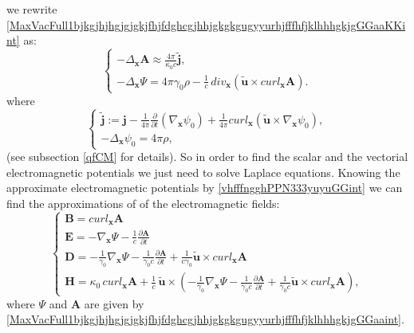 \documentclass{article}
\theoremstyle{definition}
\theoremstyle{remark}
\renewcommand{\vec}[1]{\mathbf{#1}}
\newcommand{\R}{\mathbb{R}}
\newcommand{\er}{\eqref}
\newcommand{\R}{{\mathbb{R}}}
\newcommand{\er}{\eqref}
\begin{document}
%
%
%
we rewrite
\er{MaxVacFull1bjkgjhjhgjgjgkjfhjfdghcgjhhjgkgkgugyyurhjfffhfjklhhhgkjgGGaaKKint}
as:
\begin{equation}\label{MaxVacFull1bjkgjhjhgjgjgkjfhjfdghcgjhhjgkgkgugyyurhjfffhfjklhhhgkjgGGaaint}
\begin{cases}
-\Delta_{\vec x}\vec A \approx\frac{4\pi}{\kappa_0 c}\vec {\widetilde j},\\
-\Delta_{\vec x}\Psi= 4\pi\gamma_0\rho-\frac{1}{c}\,div_{\vec
x}\left(\vec {\tilde u}\times curl_{\vec x} \vec A\right).
\end{cases}
\end{equation}
where
\begin{equation}\label{reducedcurrentfhfhjfhjGGaakklklint}
\begin{cases}
\vec {\widetilde j}:=\vec j-\frac{1}{4\pi}\frac{\partial}{\partial
t} \left(\nabla_{\vec x}\psi_0\right)+\frac{1}{4\pi}curl_{\vec
x}\left(\vec {\tilde u}\times \nabla_{\vec x}\psi_0\right),\\
-\Delta_{\vec x}\psi_0= 4\pi\rho,
\end{cases}
\end{equation}
(see subsection \ref{qfCM} for details). So in order to find the
scalar and the vectorial electromagnetic potentials we just need to
solve Laplace equations. Knowing the approximate electromagnetic
potentials by \er{vhfffngghPPN333yuyuGGint} we can find the
approximations of of the electromagnetic fields:
\begin{equation}\label{MaxVacFull1bjkgjhjhgjgjgkjfhjfdghghligioiuittrhiguffGGaaint}
\begin{cases}
\vec B= curl_{\vec x} \vec A\\
\vec E=-\nabla_{\vec x}\Psi-\frac{1}{c}\frac{\partial\vec
A}{\partial t}\\
 \vec D=-\frac{1}{\gamma_0}\nabla_{\vec
x}\Psi-\frac{1}{\gamma_0 c}\frac{\partial\vec A}{\partial t}+\frac{1}{c\gamma_0}\vec {\tilde u}\times curl_{\vec x}\vec A\\
\vec H=\kappa_0 \,curl_{\vec x} \vec A+\frac{1}{c}\,\vec {\tilde
u}\times\left(-\frac{1}{\gamma_0}\nabla_{\vec
x}\Psi-\frac{1}{\gamma_0 c}\frac{\partial\vec A}{\partial
t}+\frac{1}{\gamma_0 c}\vec {\tilde u}\times curl_{\vec x}\vec
A\right),
\end{cases}
\end{equation}
where $\Psi$ and $\vec A$ are given by
\er{MaxVacFull1bjkgjhjhgjgjgkjfhjfdghcgjhhjgkgkgugyyurhjfffhfjklhhhgkjgGGaaint}.
\end{document}
